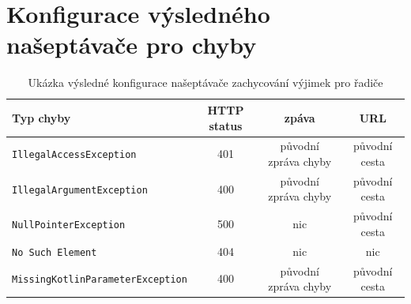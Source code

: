 \chapter{Konfigurace výsledného našeptávače pro chyby}\label{dodatek:excpetion-handler2}
    \begin{table} \centering
            \caption[Konfigurace výsledného našeptávače pro řadiče]{Ukázka výsledné konfigurace našeptávače zachycování výjimek pro řadiče}
            \begin{tabular}{|l|c|c|c|}\hline
        	  Typ chyby		& HTTP status		& zpáva	& URL 	\tabularnewline \hline \hline
        	  \texttt{IllegalAccessException}	& 401	& původní zpráva chyby		& původní cesta     \tabularnewline \hline
        	  \texttt{IllegalArgumentException}	& 400	& původní zpráva chyby		& původní cesta     \tabularnewline \hline
        	  \texttt{NullPointerException}	& 500	& nic		& původní cesta     \tabularnewline \hline
        	  \texttt{No Such Element}	& 404	& nic		& nic     \tabularnewline \hline
        	  \texttt{MissingKotlinParameterException}	& 400	& původní zpráva chyby		& původní cesta     \tabularnewline \hline
            \end{tabular}
    \end{table}
